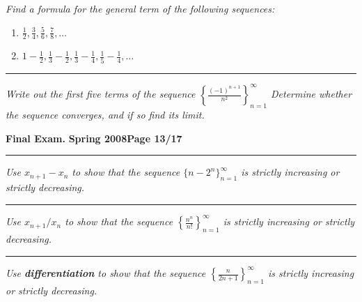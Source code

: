 \documentclass[12pt]{article}
\begin{document}
{\bigskip
{\problem[10 pts] \em  Find a formula for the general term of the following sequences:} 
\begin{enumerate}
\item $\displaystyle{\frac{1}{2}, \frac{3}{4}, \frac{5}{6}, \frac{7}{8}, \dotsc}$
\bigskip
\begin{flushright}
\end{flushright}
\item $\displaystyle{1-\frac{1}{2}, \frac{1}{3} - \frac{1}{2}, \frac{1}{3} - \frac{1}{4}, \frac{1}{5}-\frac{1}{4}, \dotsc}$
\vspace{3cm}
\begin{flushright}
\end{flushright}
\end{enumerate}
\hrule
{\problem[10pts] \em Write out the first five terms of the sequence $\left\{ \displaystyle{\frac{(-1)^{n+1}}{n^2}} \right\}_{n=1}^\infty$ \newline Determine whether the sequence converges, and if so find its limit.
\vspace{7cm}
\begin{flushright}
\end{flushright}
\newpage


\hfill{\large\bf Final Exam.}\hfill{\large\bf
  Spring 2008}\hfill{\large\bf Page 13/17}\hrule

\bigskip
{\problem[5 pts] \em Use $x_{n+1}-x_n$ to show that the sequence $\big\{ n-2^n \big\}_{n=1}^\infty$ is strictly increasing or strictly decreasing.}
\vspace{6.5cm}
\hrule
{\problem[5 pts] \em Use $x_{n+1}/x_n$ to show that the sequence $\left\{ \displaystyle{\frac{n^n}{n!}} \right\}_{n=1}^\infty$ is strictly increasing or strictly decreasing.}
\vspace{6.5cm}
\hrule
{\problem[5 pts] \em Use \textbf{differentiation} to show that the sequence $\left\{ \displaystyle{\frac{n}{2n+1}} \right\}_{n=1}^\infty$ is strictly increasing or strictly decreasing.}
\newpage

}}
\end{document}
